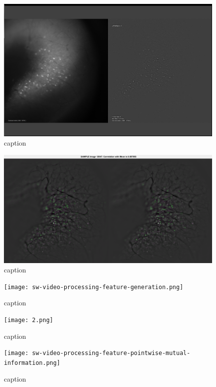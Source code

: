 \documentclass[../main.tex]{subfiles}
\begin{document}
\begin{figure}[htb]\centering
	\includegraphics[width=15cm]{Screenshot_20150608180058.png}
	\caption{caption}
\end{figure}

\begin{figure}[htb]\centering
	\includegraphics[width=15cm]{motion_correction_sample.png}
	\caption{caption}
\end{figure}

\begin{figure}[htb]\centering
	\texttt{[image: sw-video-processing-feature-generation.png]}
	\caption{caption}
\end{figure}

\begin{figure}[htb]\centering
	\texttt{[image: 2.png]}
	\caption{caption}
\end{figure}

\begin{figure}[htb]\centering
	\texttt{[image: sw-video-processing-feature-pointwise-mutual-information.png]}
	\caption{caption}
\end{figure}
\end{document}

